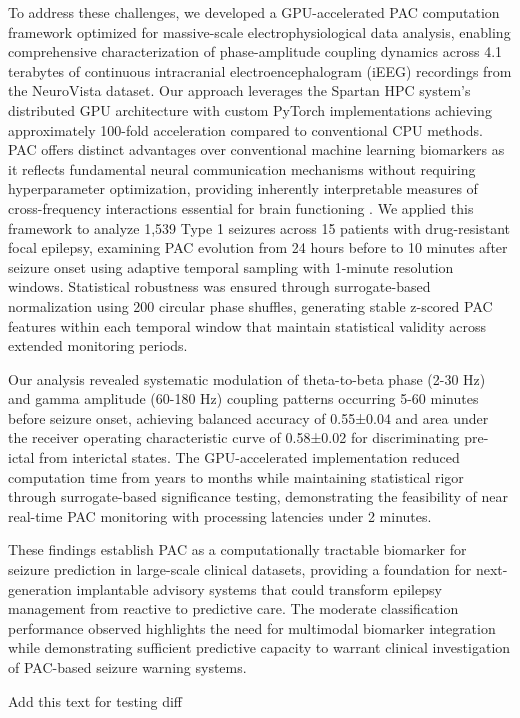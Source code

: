 	To address these challenges, we developed a GPU-accelerated PAC computation framework optimized for massive-scale electrophysiological data analysis, enabling comprehensive characterization of phase-amplitude coupling dynamics across 4.1 terabytes of continuous intracranial electroencephalogram (iEEG) recordings from the NeuroVista dataset. Our approach leverages the Spartan HPC system's distributed GPU architecture with custom PyTorch implementations achieving approximately 100-fold acceleration compared to conventional CPU methods. PAC offers distinct advantages over conventional machine learning biomarkers as it reflects fundamental neural communication mechanisms without requiring hyperparameter optimization, providing inherently interpretable measures of cross-frequency interactions essential for brain functioning . We applied this framework to analyze 1,539 Type 1 seizures across 15 patients with drug-resistant focal epilepsy, examining PAC evolution from 24 hours before to 10 minutes after seizure onset using adaptive temporal sampling with 1-minute resolution windows. Statistical robustness was ensured through surrogate-based normalization using 200 circular phase shuffles, generating stable z-scored PAC features within each temporal window that maintain statistical validity across extended monitoring periods. 

	Our analysis revealed systematic modulation of theta-to-beta phase (2-30 Hz) and gamma amplitude (60-180 Hz) coupling patterns occurring 5-60 minutes before seizure onset, achieving balanced accuracy of 0.55±0.04 and area under the receiver operating characteristic curve of 0.58±0.02 for discriminating pre-ictal from interictal states. The GPU-accelerated implementation reduced computation time from years to months while maintaining statistical rigor through surrogate-based significance testing, demonstrating the feasibility of near real-time PAC monitoring with processing latencies under 2 minutes. 

These findings establish PAC as a computationally tractable biomarker for seizure prediction in large-scale clinical datasets, providing a foundation for next-generation implantable advisory systems that could transform epilepsy management from reactive to predictive care. The moderate classification performance observed highlights the need for multimodal biomarker integration while demonstrating sufficient predictive capacity to warrant clinical investigation of PAC-based seizure warning systems. 

Add this text for testing diff
\label{sec:introduction}

